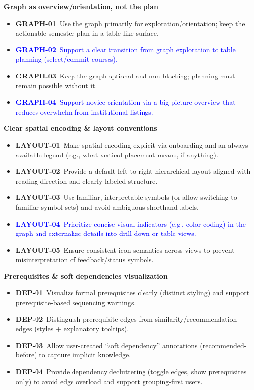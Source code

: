 \textbf{Graph as overview/orientation, not the plan}
\begin{itemize}
  \item \textbf{GRAPH-01}~Use the graph primarily for exploration/orientation; keep the actionable semester plan in a table-like surface.
  \item \textcolor{blue}{\textbf{GRAPH-02}~Support a clear transition from graph exploration to table planning (select/commit courses).}
  \item \textbf{GRAPH-03}~Keep the graph optional and non-blocking; planning must remain possible without it.
  \item \textcolor{blue}{\textbf{GRAPH-04}~Support novice orientation via a big-picture overview that reduces overwhelm from institutional listings.}
\end{itemize}

\textbf{Clear spatial encoding \& layout conventions}
\begin{itemize}
  \item \textbf{LAYOUT-01}~Make spatial encoding explicit via onboarding and an always-available legend (e.g., what vertical placement means, if anything).
  \item \textbf{LAYOUT-02}~Provide a default left-to-right hierarchical layout aligned with reading direction and clearly labeled structure.
  \item \textbf{LAYOUT-03}~Use familiar, interpretable symbols (or allow switching to familiar symbol sets) and avoid ambiguous shorthand labels.
  \item \textcolor{blue}{\textbf{LAYOUT-04}~Prioritize concise visual indicators (e.g., color coding) in the graph and externalize details into drill-down or table views.}
  \item \textbf{LAYOUT-05}~Ensure consistent icon semantics across views to prevent misinterpretation of feedback/status symbols.
\end{itemize}

\textbf{Prerequisites \& soft dependencies visualization}
\begin{itemize}
  \item \textbf{DEP-01}~Visualize formal prerequisites clearly (distinct styling) and support prerequisite-based sequencing warnings.
  \item \textbf{DEP-02}~Distinguish prerequisite edges from similarity/recommendation edges (styles + explanatory tooltips).
  \item \textbf{DEP-03}~Allow user-created “soft dependency” annotations (recommended-before) to capture implicit knowledge.
  \item \textbf{DEP-04}~Provide dependency decluttering (toggle edges, show prerequisites only) to avoid edge overload and support grouping-first users.
\end{itemize}


